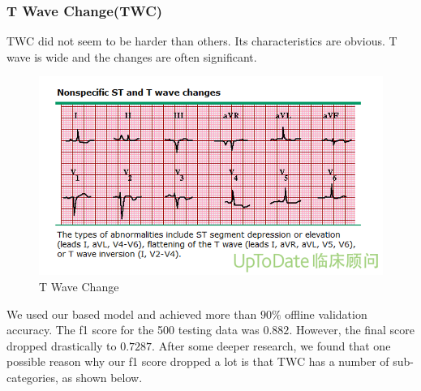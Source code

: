 \documentclass[%
 reprint,
 amsmath,amssymb,
 aps,
]{revtex4-2}
\begin{document}
\subsubsection{T Wave Change(TWC)}
TWC did not seem to be harder than others. Its characteristics are obvious. T wave is wide and the changes are often significant.
\begin{figure}[H]
	\includegraphics[width=\linewidth]{img/twc.png}
	\caption{\label{fig:twc} T Wave Change \cite{UptoDate}}
\end{figure}
We used our based model and achieved more than $90\%$ offline validation accuracy. The f1 score for the 500 testing data was $0.882$. However, the final score dropped drastically to $0.7287$. After some deeper research, we found that one possible reason why our f1 score dropped a lot is that TWC has a number of sub-categories, as shown below.
\end{document}
